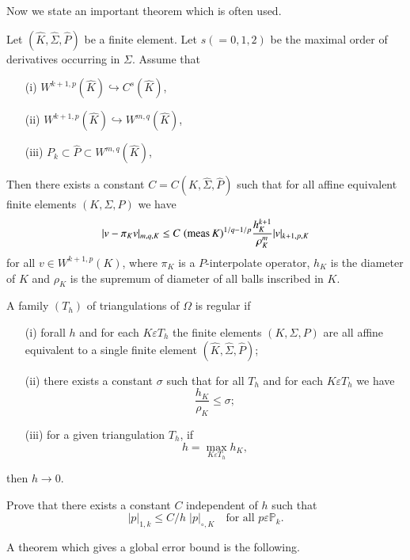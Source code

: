 Now we state an important theorem which is often used.

\begin{THM}\label{chap5:THM5}
Let $(\hat{K},\hat{\Sigma},\hat{P})$ be a finite element. Let $s(=0,
1, 2)$ be the maximal order of derivatives occurring in
$\Sigma$. Assume that 

\begin{enumerate}
\item [(i)] $W^{k+1,p}(\hat{K})\hookrightarrow C^s(\hat{K})$,
\item [(ii)] $W^{k+1,p}(\hat{K})\hookrightarrow W^{m,q}(\hat{K})$,
\item [(iii)] $P_k\subset\hat{P}\subset W^{m,q}(\hat{K})$,
\end{enumerate}

Then there exists a constant $C=C(\hat{K},\hat{\Sigma},\hat{P})$ such
that for all affine equivalent finite elements $(K,\Sigma,P)$ we have 
$$
|v-\pi_Kv|_{m,q,K}\leq C\;(\operatorname{meas} K)^{1/q-1/p}\frac{h_K^{k+1}}
{\rho_K^m}|v|_{k+1,p,K}
$$
for all $v\in W^{k+1,p}(K)$, where $\pi_K$ is a
$P$-interpolate operator, $h_K$ is the diameter of $K$ and $\rho_K$ is
the supremum of diameter of all balls inscribed in $K$.
\end{THM}

\begin{def*}
A family $(T_h)$ of triangulations of $\Omega$ is regular if 
\begin{enumerate}
\item [(i)] for\pageoriginale all $h$ and for each $K\varepsilon T_h$ the 
finite elements $(K,\Sigma, P)$ are all affine equivalent to a single
  finite element $(\hat{K},\hat{\Sigma},\hat{P})$;
\item [(ii)] there exists a constant $\sigma$ such that for all $T_h$
  and for each $K\varepsilon T_h$ we have 
$$
\frac{h_K}{\rho_K}\leq\sigma;
$$
\item [(iii)] for a given triangulation $T_h$, if 
$$
h=\max\limits_{K\varepsilon T_h}h_K,
$$
\end{enumerate}
then $h\to 0$.
\end{def*}

\setcounter{exercise}{0}
\begin{exercise}\label{chap5:exr1}
Prove that there exists a constant $C$ independent of $h$ such that 
$$
|p|_{1,k}\leq C/h\;|p|_{\circ,K}\quad\text{for all } p\varepsilon
\mathbb{P}_k. 
$$

A theorem which gives a global error bound is the following.
\end{exercise}

